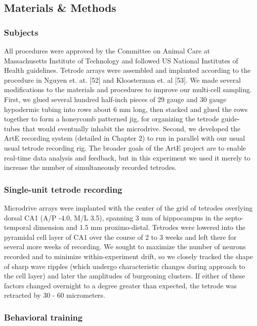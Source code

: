 \documentclass[]{article}
\begin{document}
\subsection{Materials \& Methods}

\subsubsection{Subjects}

All procedures were approved by the Committee on Animal Care at
Massachusetts Institute of Technology and followed US National
Institutes of Health guidelines. Tetrode arrays were assembled and
implanted according to the procedure in Nguyen et. at. {[}52{]} and
Kloosterman et. al {[}53{]}. We made several modifications to the
materials and procedures to improve our multi-cell sampling. First, we
glued several hundred half-inch pieces of 29 gauge and 30 gauge
hypodermic tubing into rows about 6 mm long, then stacked and glued the
rows together to form a honeycomb patterned jig, for organizing the
tetrode guide-tubes that would eventually inhabit the microdrive.
Second, we developed the ArtE recording system (detailed in Chapter 2)
to run in parallel with our usual usual tetrode recording rig. The
broader goals of the ArtE project are to enable real-time data analysis
and feedback, but in this experiment we used it merely to increase the
number of simultaneously recorded tetrodes.

\subsubsection{Single-unit tetrode recording}

Microdrive arrays were implanted with the center of the grid of tetrodes
overlying dorsal CA1 (A/P -4.0, M/L 3.5), spanning 3 mm of hippocampus
in the septo-temporal dimension and 1.5 mm proximo-distal. Tetrodes were
lowered into the pyramidal cell layer of CA1 over the course of 2 to 3
weeks and left there for several more weeks of recording. We sought to
maximize the number of neurons recorded and to minimize
within-experiment drift, so we closely tracked the shape of sharp wave
ripples (which undergo characteristic changes during approach to the
cell layer) and later the amplitudes of burgeoning clusters. If either
of these factors changed overnight to a degree greater than expected,
the tetrode was retracted by 30 - 60 micrometers.

\subsubsection{Behavioral training}
\end{document}
